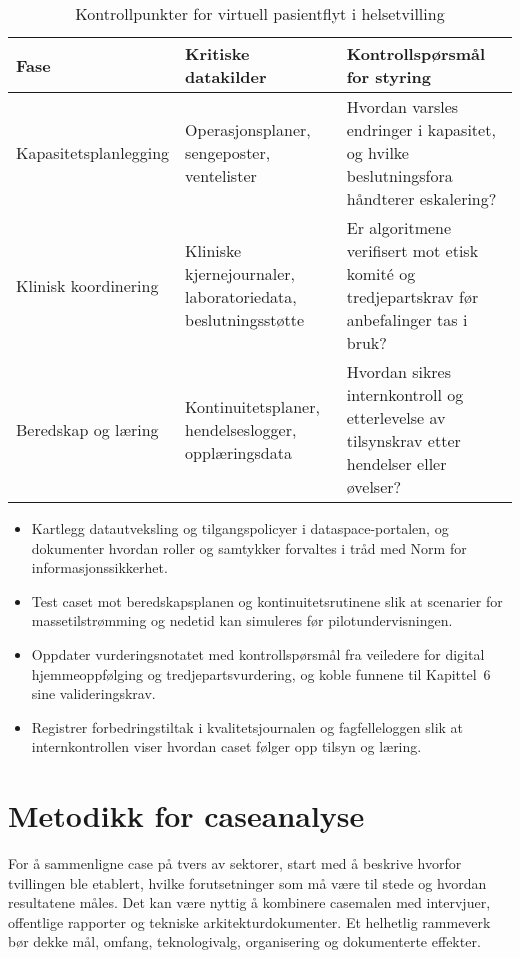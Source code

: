 \begin{table}[h]
    \centering
    \caption{Kontrollpunkter for virtuell pasientflyt i helsetvilling}
    \label{tab:helse-pasientflyt}
    \begin{tabular}{p{3.4cm}p{4.7cm}p{4.6cm}}
        \toprule
        Fase & Kritiske datakilder & Kontrollspørsmål for styring \\
        \midrule
        Kapasitetsplanlegging & Operasjonsplaner, sengeposter, ventelister & Hvordan varsles endringer i kapasitet, og hvilke beslutningsfora håndterer eskalering? \\
        Klinisk koordinering & Kliniske kjernejournaler, laboratoriedata, beslutningsstøtte & Er algoritmene verifisert mot etisk komité og tredjepartskrav før anbefalinger tas i bruk?\citep{ehelse2024tilsyn} \\
        Beredskap og læring & Kontinuitetsplaner, hendelseslogger, opplæringsdata & Hvordan sikres internkontroll og etterlevelse av tilsynskrav etter hendelser eller øvelser?\citep{helsetilsynet2024internkontroll} \\
        \bottomrule
    \end{tabular}
\end{table}

\begin{itemize}
    \item Kartlegg datautveksling og tilgangspolicyer i dataspace-portalen, og dokumenter hvordan roller og samtykker forvaltes i tråd med Norm for informasjonssikkerhet.\citep{nhn2024dataspace,norm2023}
    \item Test caset mot beredskapsplanen og kontinuitetsrutinene slik at scenarier for massetilstrømming og nedetid kan simuleres før pilotundervisningen.\citep{hod2020beredskap,helseplattformen2023kontinuitet}
    \item Oppdater vurderingsnotatet med kontrollspørsmål fra veiledere for digital hjemmeoppfølging og tredjepartsvurdering, og koble funnene til Kapittel~6 sine valideringskrav.\citep{helsedir2020dho,ehelse2024tilsyn}
    \item Registrer forbedringstiltak i kvalitetsjournalen og fagfelleloggen slik at internkontrollen viser hvordan caset følger opp tilsyn og læring.\citep{helsetilsynet2024internkontroll}
\end{itemize}

\section{Metodikk for caseanalyse}
For å sammenligne case på tvers av sektorer, start med å beskrive hvorfor tvillingen ble etablert, hvilke forutsetninger som må være til stede og hvordan resultatene måles. Det kan være nyttig å kombinere casemalen med intervjuer, offentlige rapporter og tekniske arkitekturdokumenter. Et helhetlig rammeverk bør dekke mål, omfang, teknologivalg, organisering og dokumenterte effekter.

